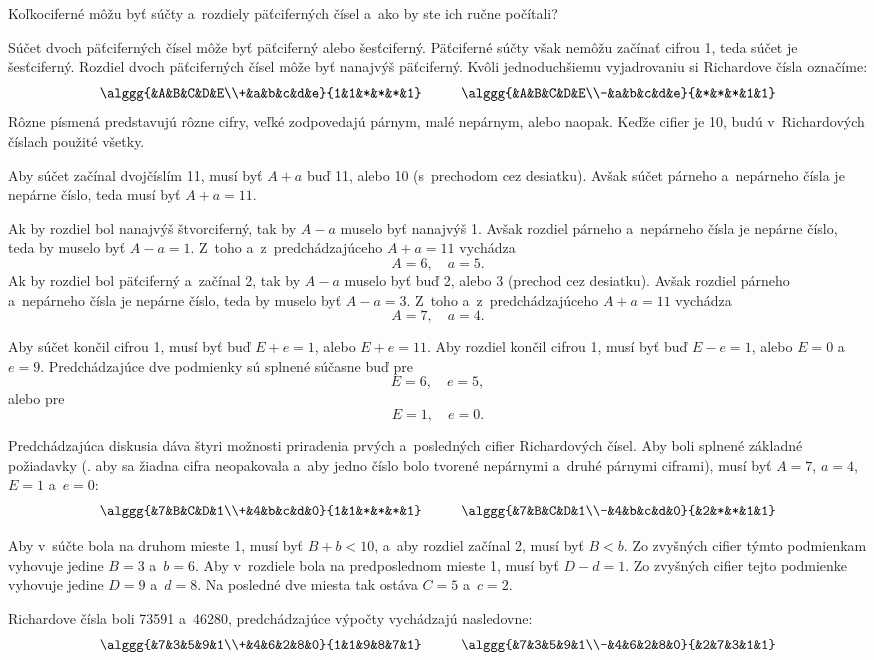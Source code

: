{%
\napad
Koľkociferné môžu byť súčty a~rozdiely päťciferných čísel a~ako by ste ich ručne počítali?

\riesenie
Súčet dvoch päťciferných čísel môže byť päťciferný alebo šesťciferný.
Päťciferné súčty však nemôžu začínať cifrou 1, teda súčet je šesťciferný.
Rozdiel dvoch päťciferných čísel môže byť nanajvýš päťciferný.
Kvôli jednoduchšiemu vyjadrovaniu si Richardove čísla označíme:
$$
\alggg{&A&B&C&D&E\\+&a&b&c&d&e}{1&1&*&*&*&1}
\hskip1cm
\alggg{&A&B&C&D&E\\-&a&b&c&d&e}{&*&*&*&1&1}
$$
Rôzne písmená predstavujú rôzne cifry, veľké zodpovedajú párnym, malé nepárnym, alebo naopak.
Keďže cifier je 10, budú v~Richardových číslach použité všetky.

Aby súčet začínal dvojčíslím 11, musí byť $A+a$ buď 11, alebo 10 (s~prechodom cez desiatku).
Avšak súčet párneho a~nepárneho čísla je nepárne číslo, teda musí byť
$A+a=11$.

Ak by rozdiel bol nanajvýš štvorciferný, tak by $A-a$ muselo byť nanajvýš 1.
Avšak rozdiel párneho a~nepárneho čísla je nepárne číslo, teda by muselo byť $A-a=1$.
Z~toho a~z~predchádzajúceho $A+a=11$ vychádza
$$
A=6,\quad a=5.
$$
Ak by rozdiel bol päťciferný a~začínal 2, tak by $A-a$ muselo byť buď 2, alebo 3 (prechod cez desiatku).
Avšak rozdiel párneho a~nepárneho čísla je nepárne číslo, teda by muselo byť $A-a=3$.
Z~toho a~z~predchádzajúceho $A+a=11$ vychádza
$$
A=7,\quad a=4.
$$

Aby súčet končil cifrou 1, musí byť buď $E+e=1$, alebo $E+e=11$.
Aby rozdiel končil cifrou 1, musí byť buď $E-e=1$, alebo $E=0$ a~$e=9$.
Predchádzajúce dve podmienky sú splnené súčasne buď pre
$$E=6,\quad e=5,
$$
alebo pre
$$E=1,\quad e=0.
$$

Predchádzajúca diskusia dáva štyri možnosti priradenia prvých a~posledných cifier Richardových čísel.
Aby boli splnené základné požiadavky
(\tj. aby sa žiadna cifra neopakovala a~aby jedno číslo bolo tvorené nepárnymi a~druhé párnymi ciframi),
musí byť $A=7$, $a=4$, $E=1$ a~$e=0$:
$$
\alggg{&7&B&C&D&1\\+&4&b&c&d&0}{1&1&*&*&*&1}
\hskip1cm
\alggg{&7&B&C&D&1\\-&4&b&c&d&0}{&2&*&*&1&1}
$$

Aby v~súčte bola na druhom mieste 1, musí byť $B+b<10$, a~aby rozdiel začínal 2, musí byť $B<b$.
Zo zvyšných cifier týmto podmienkam vyhovuje jedine $B=3$ a~$b=6$.
Aby v~rozdiele bola na predposlednom mieste 1, musí byť $D-d=1$.
Zo zvyšných cifier tejto podmienke vyhovuje jedine $D=9$ a~$d=8$.
Na posledné dve miesta tak ostáva $C=5$ a~$c=2$.

Richardove čísla boli 73591 a~46280, predchádzajúce výpočty vychádzajú nasledovne:
$$
\alggg{&7&3&5&9&1\\+&4&6&2&8&0}{1&1&9&8&7&1}
\hskip1cm
\alggg{&7&3&5&9&1\\-&4&6&2&8&0}{&2&7&3&1&1}
$$
}

